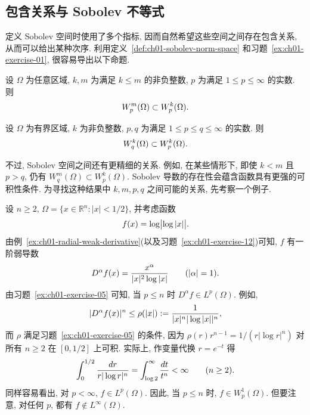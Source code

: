 \subsection{包含关系与 Sobolev 不等式}
\label{sec:ch01-inclusions-sobolev-inequality}

定义 Sobolev 空间时使用了多个指标, 因而自然希望这些空间之间存在包含关系, 从而可以给出某种次序. 利用定义~\ref{def:ch01-sobolev-norm-space} 和习题~\ref{ex:ch01-exercise-01}, 很容易导出以下命题.

\setcounter{thmcount}{0}
\begin{Proposition}
\label{prop:ch01-sobolev-order-inclusion}
设 $\Omega$ 为任意区域, $k,m$ 为满足 $k\leq m$ 的非负整数, $p$ 为满足 $1\leq p\leq\infty$ 的实数. 则
\[
\MathBookFormulaID{formula-ch01-sobolev-order-inclusion}
W_p^m(\Omega)\subset W_p^k(\Omega).
\]
\end{Proposition}

\begin{Proposition}
\label{prop:ch01-sobolev-integrability-inclusion}
设 $\Omega$ 为有界区域, $k$ 为非负整数, $p,q$ 为满足 $1\leq p\leq q\leq\infty$ 的实数. 则
\[
\MathBookFormulaID{formula-ch01-sobolev-integrability-inclusion}
W_q^k(\Omega)\subset W_p^k(\Omega).
\]
\end{Proposition}

不过, Sobolev 空间之间还有更精细的关系. 例如, 在某些情形下, 即使 $k<m$ 且 $p>q$, 仍有 $W_q^m(\Omega)\subset W_p^k(\Omega)$. Sobolev 导数的存在性会蕴含函数具有更强的可积性条件. 为寻找这种结果中 $k,m,p,q$ 之间可能的关系, 先考察一个例子.

\begin{Example}
\label{ex:ch01-unbounded-sobolev-function}
设 $n\geq2$, $\Omega=\{x\in\mathbb R^n:|x|<1/2\}$, 并考虑函数
\[
\MathBookFormulaID{formula-ch01-log-log-function}
f(x)=\log\bigl|\log|x|\bigr|.
\]
由例~\ref{ex:ch01-radial-weak-derivative}(以及习题~\ref{ex:ch01-exercise-12})可知, $f$ 有一阶弱导数
\[
\MathBookFormulaID{formula-ch01-log-log-weak-derivative}
D^\alpha f(x)=\frac{x^\alpha}{|x|^2\log|x|}
\qquad(|\alpha|=1).
\]
由习题~\ref{ex:ch01-exercise-05} 可知, 当 $p\leq n$ 时 $D^\alpha f\in L^p(\Omega)$. 例如,
\[
\MathBookFormulaID{formula-ch01-log-log-derivative-bound}
|D^\alpha f(x)|^n\leq\rho(|x|):=
\frac{1}{|x|^n|\log|x||^n},
\]
而 $\rho$ 满足习题~\ref{ex:ch01-exercise-05} 的条件, 因为 $\rho(r)r^{n-1}=1/(r|\log r|^n)$ 对所有 $n\geq2$ 在 $[0,1/2]$ 上可积. 实际上, 作变量代换 $r=e^{-t}$ 得
\[
\MathBookFormulaID{formula-ch01-log-log-integral}
\int_0^{1/2}\frac{dr}{r|\log r|^n}
=\int_{\log2}^\infty\frac{dt}{t^n}<\infty
\qquad(n\geq2).
\]
同样容易看出, 对 $p<\infty$, $f\in L^p(\Omega)$. 因此, 当 $p\leq n$ 时, $f\in W_p^1(\Omega)$. 但要注意, 对任何 $p$, 都有 $f\notin L^\infty(\Omega)$.
\end{Example}

